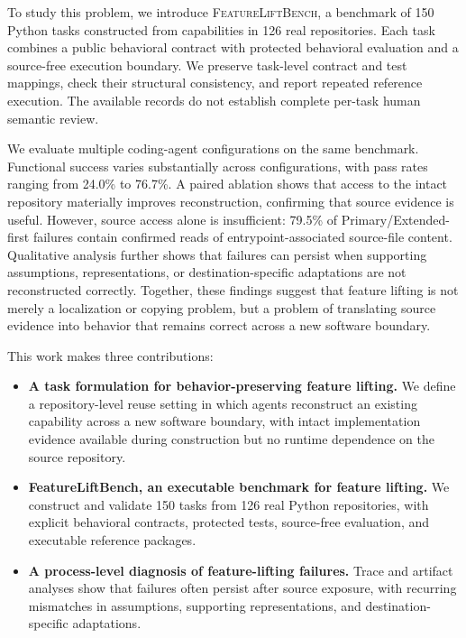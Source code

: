 \documentclass[acmsmall,screen,review,anonymous]{acmart}
\newcommand{\flb}{\textsc{FeatureLiftBench}\xspace}
\begin{document}
To study this problem, we introduce \flb, a benchmark of 150 Python tasks
constructed from capabilities in 126 real repositories. Each task combines a
public behavioral contract with protected behavioral evaluation and a
source-free execution boundary. We preserve task-level contract and test
mappings, check their structural consistency, and report repeated reference
execution. The available records do not establish complete per-task human
semantic review.

We evaluate multiple coding-agent configurations on the same benchmark.
Functional success varies substantially across configurations, with pass rates
ranging from 24.0\% to 76.7\%. A paired ablation shows that access to the intact
repository materially improves reconstruction, confirming that source evidence
is useful. However, source access alone is insufficient: 79.5\% of
Primary/Extended-first failures contain confirmed reads of
entrypoint-associated source-file content. Qualitative analysis further shows
that failures can persist when supporting assumptions, representations, or
destination-specific adaptations are not reconstructed correctly. Together,
these findings suggest that feature lifting is not merely a localization or
copying problem, but a problem of translating source evidence into behavior that
remains correct across a new software boundary.

This work makes three contributions:
\begin{itemize}
  \item \textbf{A task formulation for behavior-preserving feature lifting.}
  We define a repository-level reuse setting in which agents reconstruct an
  existing capability across a new software boundary, with intact implementation
  evidence available during construction but no runtime dependence on the source
  repository.

  \item \textbf{FeatureLiftBench, an executable benchmark for feature lifting.}
  We construct and validate 150 tasks from 126 real Python repositories, with
  explicit behavioral contracts, protected tests, source-free evaluation, and
  executable reference packages.

  \item \textbf{A process-level diagnosis of feature-lifting failures.}
  Trace and artifact analyses show that failures often persist after source
  exposure, with recurring mismatches in assumptions, supporting representations,
  and destination-specific adaptations.
\end{itemize}
\end{document}
